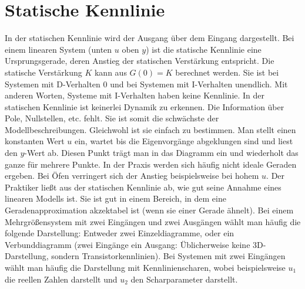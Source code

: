 \documentclass[
  ngerman
  ,12pt
  ,pdftex
]{article}
\begin{document}
\section{Statische Kennlinie}%
In der statischen Kennlinie wird der Ausgang über dem Eingang dargestellt. Bei einem linearen System (unten $u$ oben $y$) ist die statische Kennlinie eine Ursprungsgerade, deren Anstieg der statischen Verstärkung entspricht. Die statische Verstärkung $K$ kann aus $G(0)=K$ berechnet werden. Sie ist bei Systemen mit D-Verhalten 0 und bei Systemen mit I-Verhalten unendlich. Mit anderen Worten, Systeme mit I-Verhalten haben keine Kennlinie. In der statischen Kennlinie ist keinerlei Dynamik zu erkennen. Die Information über Pole, Nullstellen, etc. fehlt. Sie ist somit die schwächste der Modellbeschreibungen. Gleichwohl ist sie einfach zu bestimmen. Man stellt einen konstanten Wert $u$ ein, wartet bis die Eigenvorgänge abgeklungen 
sind und liest den $y$-Wert ab. Diesen Punkt trägt man in das Diagramm ein und wiederholt das ganze für mehrere Punkte. In der Praxis werden sich häufig nicht ideale Geraden ergeben. Bei Öfen verringert sich der Anstieg beispielsweise bei hohem $u$. Der Praktiker ließt aus der statischen Kennlinie ab, wie gut seine Annahme eines linearen Modells ist. Sie ist gut in einem Bereich, in dem eine Geradenapproximation akzektabel ist (wenn sie einer Gerade ähnelt). Bei einem Mehrgrößensystem mit zwei Eingängen und zwei Ausgängen wählt man häufig die folgende Darstellung: Entweder zwei Einzeldiagramme, oder ein Verbunddiagramm (zwei Eingänge ein Ausgang: Üblicherweise keine 3D-Darstellung, sondern Transistorkennlinien). Bei Systemen mit zwei Eingängen 
wählt man häufig die Darstellung mit Kennlinienscharen, wobei beispielsweise $u_{1}$ die reellen Zahlen darstellt und $u_{2}$ den Scharparameter darstellt.
\end{document}
